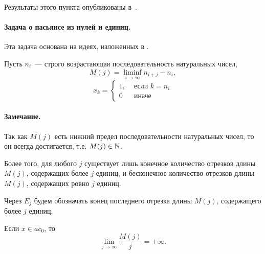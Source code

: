 Результаты этого пункта опубликованы в~\cite{our-mz2019ac0}.

\paragraph{Задача о пасьянсе из нулей и единиц.}

Эта задача основана на идеях, изложенных в \cite[\S 5]{Semenov2014geomprops}.

Пусть $n_i$~--- строго возрастающая последовательность натуральных чисел,
\begin{equation}
	\label{eq:definition_M_j}
	M(j) = \liminf_{i\to\infty} n_{i+j} - n_i,
\end{equation}
\begin{equation}
	x_k = \left\{\begin{array}{ll}
		1, & \mbox{~если~} k = n_i
		\\
		0  & \mbox{~иначе~}
	\end{array}\right.
\end{equation}

\paragraph{Замечание.}
Так как $M(j)$ есть нижний предел последовательности натуральных чисел,
то он всегда достигается,
т.е. $M(j)\in\mathbb{N}$.

Более того, для любого $j$ существует лишь конечное количество отрезков длины $M(j)$,
содержащих более $j$ единиц,
и бесконечное количество отрезков длины $M(j)$,
содержащих ровно $j$ единиц.

Через $E_j$ будем обозначать конец последнего отрезка длины $M(j)$,
содержащего более $j$ единиц.

\begin{lemma}
	\label{thm:lim_M(j)/j_neobh}
	Если $x \in ac_0$, то
	\begin{equation}\label{lim_M(j)/j}
		\lim_{j \to \infty} \frac{M(j)}{j} = +\infty
		.
	\end{equation}
\end{lemma}

